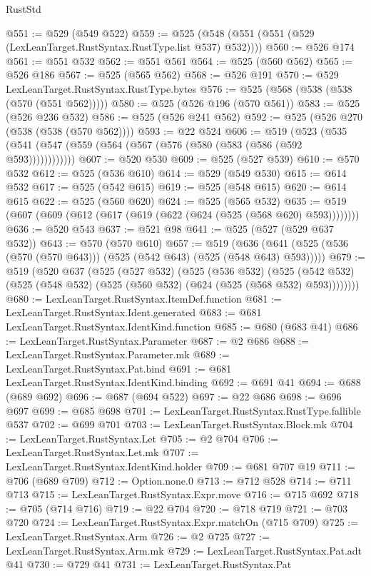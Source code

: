 \begin{lexlean}{RustStd}
\begin{coremodule}
@551 := @529 (@549 @522)
@559 := @525 (@548 (@551 (@551 (@529 (LexLeanTarget.RustSyntax.RustType.list @537) @532))))
@560 := @526 @174
@561 := @551 @532
@562 := @551 @561
@564 := @525 (@560 @562)
@565 := @526 @186
@567 := @525 (@565 @562)
@568 := @526 @191
@570 := @529 LexLeanTarget.RustSyntax.RustType.bytes
@576 := @525 (@568 (@538 (@538 (@570 (@551 @562)))))
@580 := @525 (@526 @196 (@570 @561))
@583 := @525 (@526 @236 @532)
@586 := @525 (@526 @241 @562)
@592 := @525 (@526 @270 (@538 (@538 (@570 @562))))
@593 := @22 @524
@606 := @519
    (@523 (@535 (@541 (@547 (@559 (@564 (@567 (@576 (@580 (@583 (@586 (@592 @593))))))))))))
@607 := @520 @530
@609 := @525 (@527 @539)
@610 := @570 @532
@612 := @525 (@536 @610)
@614 := @529 (@549 @530)
@615 := @614 @532
@617 := @525 (@542 @615)
@619 := @525 (@548 @615)
@620 := @614 @615
@622 := @525 (@560 @620)
@624 := @525 (@565 @532)
@635 := @519 (@607 (@609 (@612 (@617 (@619 (@622 (@624 (@525 (@568 @620) @593))))))))
@636 := @520 @543
@637 := @521 @98
@641 := @525 (@527 (@529 @637 @532))
@643 := @570 (@570 @610)
@657 := @519
    (@636 (@641 (@525 (@536 (@570 (@570 @643))) (@525 (@542 @643) (@525 (@548 @643) @593)))))
@679 := @519
    (@520
      @637
      (@525
        (@527 @532)
        (@525
          (@536 @532)
          (@525 (@542 @532) (@525 (@548 @532) (@525 (@560 @532) (@624 (@525 (@568 @532) @593))))))))
@680 := LexLeanTarget.RustSyntax.ItemDef.function
@681 := LexLeanTarget.RustSyntax.Ident.generated
@683 := @681 LexLeanTarget.RustSyntax.IdentKind.function
@685 := @680 (@683 @41)
@686 := LexLeanTarget.RustSyntax.Parameter
@687 := @2 @686
@688 := LexLeanTarget.RustSyntax.Parameter.mk
@689 := LexLeanTarget.RustSyntax.Pat.bind
@691 := @681 LexLeanTarget.RustSyntax.IdentKind.binding
@692 := @691 @41
@694 := @688 (@689 @692)
@696 := @687 (@694 @522)
@697 := @22 @686
@698 := @696 @697
@699 := @685 @698
@701 := LexLeanTarget.RustSyntax.RustType.fallible @537
@702 := @699 @701
@703 := LexLeanTarget.RustSyntax.Block.mk
@704 := LexLeanTarget.RustSyntax.Let
@705 := @2 @704
@706 := LexLeanTarget.RustSyntax.Let.mk
@707 := LexLeanTarget.RustSyntax.IdentKind.holder
@709 := @681 @707 @19
@711 := @706 (@689 @709)
@712 := Option.none.{0}
@713 := @712 @528
@714 := @711 @713
@715 := LexLeanTarget.RustSyntax.Expr.move
@716 := @715 @692
@718 := @705 (@714 @716)
@719 := @22 @704
@720 := @718 @719
@721 := @703 @720
@724 := LexLeanTarget.RustSyntax.Expr.matchOn (@715 @709)
@725 := LexLeanTarget.RustSyntax.Arm
@726 := @2 @725
@727 := LexLeanTarget.RustSyntax.Arm.mk
@729 := LexLeanTarget.RustSyntax.Pat.adt @41
@730 := @729 @41
@731 := LexLeanTarget.RustSyntax.Pat

\end{coremodule}
\end{lexlean}
